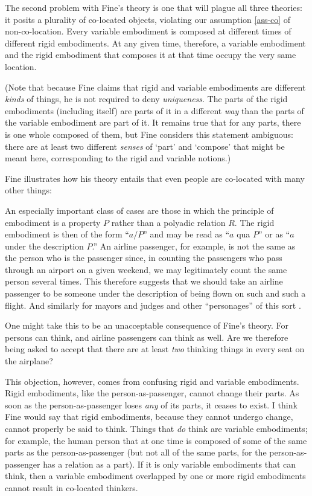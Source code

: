 \documentclass[11pt]{article}
\newenvironment{squote}{%
\begin{spacing}{1}
\begin{list}{}{%
\setlength{\labelwidth}{0pt}%
\rightmargin\leftmargin%
}
\item\relax
}{%
\end{list}%
\end{spacing}
}
\begin{document}
\begin{spacing}{1.5}
The second problem with Fine's theory is one that will plague all
three theories: it posits a plurality of co-located objects, violating
our assumption \ref{ass-co} of non-co-location.  Every variable
embodiment is composed at different times of different rigid
embodiments.  At any given time, therefore, a variable embodiment and
the rigid embodiment that composes it at that time occupy the very
same location.

(Note that because Fine claims that rigid and variable embodiments are
different {\em kinds} of things, he is not required to deny {\em
  uniqueness}.  The parts of the rigid embodiments (including itself)
are parts of it in a different {\em way} than the parts of the
variable embodiment are part of it.  It remains true that for any
parts, there is one whole composed of them, but Fine considers this
statement ambiguous: there are at least two different {\em senses} of
`part' and `compose' that might be meant here, corresponding to the
rigid and variable notions.)

Fine illustrates how his theory entails that even people are
co-located with many other things:

\begin{squote}
An especially important class of cases are those in which the
principle of embodiment is a property $P$ rather than a polyadic
relation $R$.  The rigid embodiment is then of the form ``$a/P$'' and
may be read as ``$a$ qua $P$'' or as ``$a$ under the description
$P$.''  An airline passenger, for example, is not the same as the
person who is the passenger since, in counting the passengers who pass
through an airport on a given weekend, we may legitimately count the
same person several times.  This therefore suggests that we should
take an airline passenger to be someone under the description of being
flown on such and such a flight.  And similarly for mayors and judges
and other ``personages'' of this sort \citeyearpar[67--68]{fine1999}.
\end{squote}

One might take this to be an unacceptable consequence of Fine's
theory.  For persons can think, and airline passengers can think as
well.  Are we therefore being asked to accept that there are at least
{\em two} thinking things in every seat on the airplane?

This objection, however, comes from confusing rigid and variable
embodiments.  Rigid embodiments, like the person-as-passenger, cannot
change their parts.  As soon as the person-as-passenger loses {\em
  any} of its parts, it ceases to exist.  I think Fine would say that
rigid embodiments, because they cannot undergo change, cannot properly
be said to think.  Things that {\em do} think are variable
embodiments; for example, the human person that at one time is
composed of some of the same parts as the person-as-passenger (but not
all of the same parts, for the person-as-passenger has a relation as a
part).  If it is only variable embodiments that can think, then a
variable embodiment overlapped by one or more rigid embodiments cannot
result in co-located thinkers.


\end{spacing}
\end{document}
